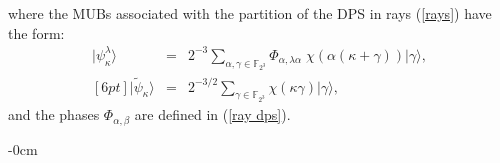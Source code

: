 \documentclass[quantumrep,article,accept,pdftex,moreauthors]{Definitions/mdpi}
\DeclareMathOperator{\tr}{tr}
\begin{document}
where the MUBs associated with the partition of the DPS in rays (\ref{rays})
have the form:
\begin{eqnarray}
  |\psi_{\kappa }^{\lambda }\rangle
  &=& 2^{-3} \sum_{\alpha,\gamma \in \mathbb{F}_{2^{3}}}
  \Phi_{\alpha,\lambda \alpha} \;
  \chi\left( \alpha(\kappa+\gamma) \right) 
  |\gamma \rangle,
  \label{explicit eigs} \\ [6pt]
  |\tilde{\psi}_{\kappa }\rangle
  &=& 2^{-3 / 2} \sum_{\gamma \in \mathbb{F}_{2^{3}}}
  \chi\left( \kappa\gamma \right) 
  |\gamma \rangle,
  \label{explicit eigf}
\end{eqnarray}
and the phases $\Phi_{\alpha,\beta}$ are defined in (\ref{ray dps}).

\begin{adjustwidth}{-\extralength}{0cm}



%



\end{adjustwidth}
\end{document}
